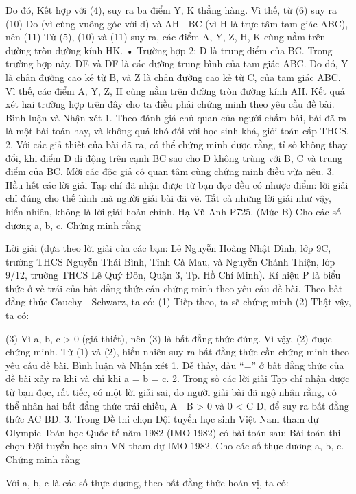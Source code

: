 \begin{multicols}{2}
{	Do đó,   Kết hợp với (4), suy ra ba điểm   Y, K thẳng hàng. Vì thế, từ (6) suy ra
	(10)
	Do   (vì cùng vuông góc với d) và AH  BC (vì H là trực tâm tam giác ABC), nên
	(11)
	Từ (5), (10) và (11) suy ra, các điểm A, Y, Z, H, K cùng nằm trên đường tròn đường kính HK.
	• Trường hợp 2: D là trung điểm của BC.
	Trong trường hợp này, DE và DF là các đường trung bình của tam giác ABC. Do đó, Y là chân đường cao kẻ từ B, và Z là chân đường cao kẻ từ C, của tam giác ABC. Vì thế, các điểm A, Y, Z, H cùng nằm trên đường tròn đường kính AH.
	Kết quả xét hai trường hợp trên đây cho ta điều phải chứng minh theo yêu cầu đề bài.
	Bình luận và Nhận xét
	1. Theo đánh giá chủ quan của người chấm bài, bài đã ra là một bài toán hay, và không quá khó đối với học sinh khá, giỏi toán cấp THCS.
	2. Với các giả thiết của bài đã ra, có thể chứng minh được rằng, tỉ số   không thay đổi, khi điểm D di động trên cạnh BC sao cho D không trùng với B, C và trung điểm của BC. Mời các độc giả có quan tâm cùng chứng minh điều vừa nêu.
	3. Hầu hết các lời giải Tạp chí đã nhận được từ bạn đọc đều có nhược điểm: lời giải chỉ đúng cho thế hình mà người giải bài đã vẽ. Tất cả những lời giải như vậy, hiển nhiên, không là lời giải hoàn chỉnh.
	Hạ Vũ Anh
	P725. (Mức B) Cho các số dương a, b, c. Chứng minh rằng
	
	Lời giải (dựa theo lời giải của các bạn: Lê Nguyễn Hoàng Nhật Đình, lớp 9C, trường THCS Nguyễn Thái Bình, Tỉnh Cà Mau, và Nguyễn Chánh Thiện, lớp 9/12, trường THCS Lê Quý Đôn, Quận 3, Tp. Hồ Chí Minh).
	Kí hiệu P là biểu thức ở vế trái của bất đẳng thức cần chứng minh theo yêu cầu đề bài.
	Theo bất đẳng thức Cauchy - Schwarz, ta có:
	(1)
	Tiếp theo, ta sẽ chứng minh
	(2)
	Thật vậy, ta có:
	
	(3)
	Vì a, b, c > 0 (giả thiết), nên (3) là bất đẳng thức đúng. Vì vậy, (2) được chứng minh.
	Từ (1) và (2), hiển nhiên suy ra bất đẳng thức cần chứng minh theo yêu cầu đề bài.
	Bình luận và Nhận xét
	1. Dễ thấy, dấu “=” ở bất đẳng thức của đề bài xảy ra khi và chỉ khi a = b = c.
	2. Trong số các lời giải Tạp chí nhận được từ bạn đọc, rất tiếc, có một lời giải sai, do người giải bài đã ngộ nhận rằng, có thể nhân hai bất đẳng thức trái chiều, A  B > 0 và 0 < C \le D, để suy ra bất đẳng thức AC \le BD.
	3. Trong Đề thi chọn Đội tuyển học sinh Việt Nam tham dự Olympic Toán học Quốc tế năm 1982 (IMO 1982) có bài toán sau:
	Bài toán thi chọn Đội tuyển học sinh VN tham dự IMO 1982. Cho các số thực dương a, b, c. Chứng minh rằng
	
	Với a, b, c là các số thực dương, theo bất đẳng thức hoán vị, ta có:
	
}
\end{multicols}
